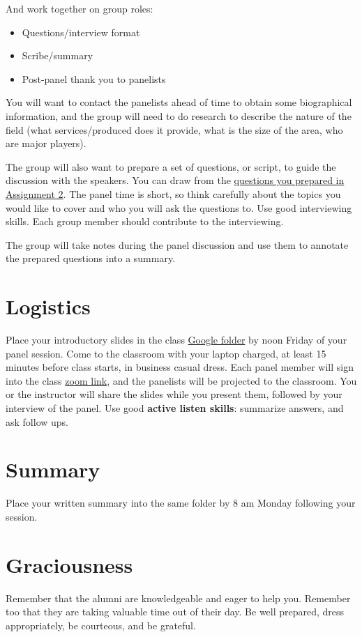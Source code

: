 \documentclass[11pt]{article}
\begin{document}
And work together on group roles:
\begin{itemize}
\item Questions/interview format
\item Scribe/summary
\item Post-panel thank you to panelists
\end{itemize}

You will want to contact the panelists ahead of time to obtain some biographical information, and the group will need to do research to describe the nature of the field (what services/produced does it provide, what is the size of the area, who are major players).

The group will also want to prepare a set of questions, or script, to guide the discussion with the speakers. You can draw from the \href{https://docs.google.com/document/d/1xEKQUh8swVG-FaPlv5Zdm7GvCSkyAsRE-FH6ohEHZMg/edit?usp=sharing}{questions you prepared in Assignment 2}. The panel time is short, so think carefully about the topics you would like to cover and who you will ask the questions to. Use good interviewing skills. Each group member should  contribute to the interviewing. 

The group will take notes during the panel discussion and use them to annotate the prepared questions into a summary.

\section{Logistics}
\label{sec:org9b1e951}
Place your introductory slides in the class \href{https://drive.google.com/drive/folders/12p1B5icXV4FetwMoPTR7hkxTTPMj53qA?usp=sharing}{Google folder} by noon Friday of your panel session. Come to the classroom with your laptop charged, at least 15 minutes before class starts, in business casual dress.  Each panel member will sign into the class \href{https://notredame.zoom.us/j/96943641641?pwd=d1NqcXdzT3hocTY1SzJLWm0wL3R3Zz09}{zoom link}, and the panelists will be projected to the classroom. You or the instructor will share the slides while you present them, followed by your interview of the panel. Use good \textbf{active listen skills}: summarize answers, and ask follow ups.

\section{Summary}
\label{sec:orgafb199b}
Place your written summary into the same folder by 8 am Monday following your session. 

\section{Graciousness}
\label{sec:orgc5cab82}
Remember that the alumni are knowledgeable and eager to help you. Remember too that they are taking valuable time out of their day. Be well prepared, dress appropriately, be courteous, and be grateful. 
\end{document}
